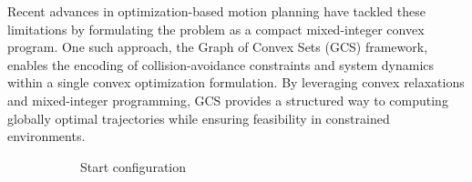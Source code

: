 \documentclass[conference]{IEEEtran}
\begin{document}
Recent advances in optimization-based motion planning have tackled these limitations by formulating the problem as a compact mixed-integer convex program\cite{marcucci2023motion}.
%
One such approach, the Graph of Convex Sets (GCS) framework\cite{marcucci2024shortest}, enables the encoding of collision-avoidance constraints and system dynamics within a single convex optimization formulation.
%
By leveraging convex relaxations and mixed-integer programming, GCS provides a structured way to computing globally optimal trajectories while ensuring feasibility in constrained environments.

\begin{figure}[!t]
    \centering
    \begin{subfigure}[b]{0.23\textwidth}
        \centering
        \captionsetup{justification=centering}
        \caption{Start configuration}
        \label{subfig:cage_start_orbit}
    \end{subfigure}\hspace{0.01\textwidth}
    \begin{subfigure}[b]{0.23\textwidth}
        \centering

\end{subfigure}
\end{figure}
\end{document}
